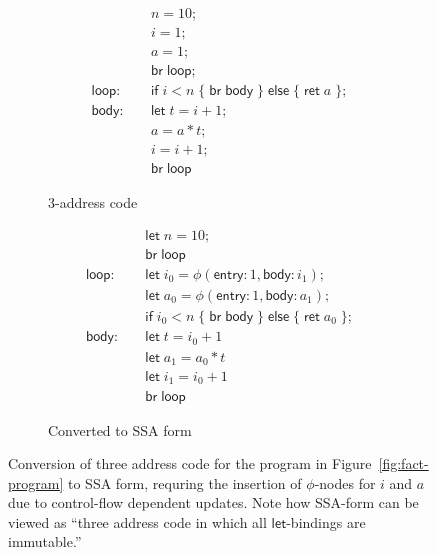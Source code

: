 \documentclass[acmsmall,screen,review]{acmart}
\newcommand{\ms}[1]{\ensuremath{\mathsf{#1}}}
\begin{document}
\begin{figure}
  \begin{subfigure}[t]{.5\textwidth}
    \begin{align*}
                        & n = 10; \\
                        & i = 1; \\
                        & a = 1; \\
                        & \ms{br}\;\ms{loop}; \\
      \ms{loop}: \quad  & \ms{if}\;i < n\;
                          \{\;\ms{br}\;\ms{body}\;\}\;
                          \ms{else}\;\{\;\ms{ret}\;a\;\}; \\
      \ms{body}: \quad  & \ms{let}\;t = i + 1; \\
                        & a = a * t; \\
                        & i = i + 1; \\
                        & \ms{br}\;\ms{loop}
    \end{align*}
    \caption{3-address code}
  \end{subfigure}%
  \begin{subfigure}[t]{.5\textwidth}
    \begin{align*}
                        & \ms{let}\;n = 10; \\
                        & \ms{br}\;\ms{loop} \\
      \ms{loop}: \quad  & \ms{let}\;i_0 = \phi(\ms{entry}: 1, \ms{body}: i_1); \\
                        & \ms{let}\;a_0 = \phi(\ms{entry}: 1, \ms{body}: a_1); \\
                        & \ms{if}\;i_0 < n\;
                          \{\;\ms{br}\;\ms{body}\;\}\;
                          \ms{else}\;\{\;\ms{ret}\;a_0\;\}; \\
      \ms{body}: \quad  & \ms{let}\;t = i_0 + 1 \\
                        & \ms{let}\;a_1 = a_0 * t \\
                        & \ms{let}\;i_1 = i_0 + 1 \\
                        & \ms{br}\;\ms{loop}
    \end{align*}
    \caption{Converted to SSA form}
    \label{fig:fact-ssa}
  \end{subfigure}
  \caption{
    Conversion of three address code for the program in Figure~\ref{fig:fact-program} to SSA 
    form, requring the insertion of $\phi$-nodes for $i$ and $a$ due to control-flow dependent
    updates. Note how SSA-form can be viewed as ``three address code in which all 
    \ms{let}-bindings are immutable.''
  }
  \Description{}
\end{figure}
 
\end{document}
